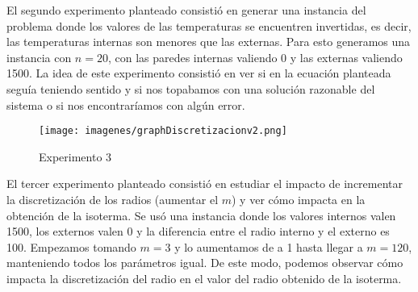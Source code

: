 El segundo experimento planteado consistió en generar una instancia del problema donde los valores de las temperaturas se encuentren invertidas, es decir, las temperaturas internas son menores que las externas. Para esto generamos una instancia con $n=20$, con las paredes internas valiendo 0 y las externas valiendo 1500. La idea de este experimento consistió en ver si en la ecuación planteada seguía teniendo sentido y si nos topabamos con una solución razonable del sistema o si nos encontraríamos con algún error.
\\
\begin{wrapfigure}{l}{0.5\textwidth}
  \vspace{-20pt}
  \begin{center}
    \texttt{[image: imagenes/graphDiscretizacionv2.png]}
  \end{center}
  \vspace{-20pt}
  \caption{Experimento 3}
  \vspace{-10pt}
  \label{fig:Exp3}
\end{wrapfigure}

El tercer experimento planteado consistió en estudiar el impacto de incrementar la discretización de los radios (aumentar el $m$) y ver cómo impacta en la obtención de la isoterma. Se usó una instancia donde los valores internos valen 1500, los externos valen 0 y la diferencia entre el radio interno y el externo es 100. Empezamos tomando $m=3$ y lo aumentamos de a 1 hasta llegar a $m=120$, manteniendo todos los parámetros igual. De este modo, podemos observar cómo impacta la discretización del radio en el valor del radio obtenido de la isoterma.\\
